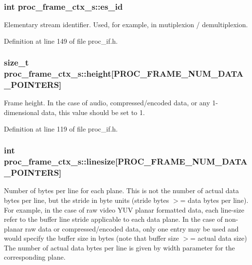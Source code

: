 \subsubsection[{\texorpdfstring{es\+\_\+id}{es_id}}]{\setlength{\rightskip}{0pt plus 5cm}int proc\+\_\+frame\+\_\+ctx\+\_\+s\+::es\+\_\+id}\hypertarget{structproc__frame__ctx__s_a457dcb8ae6440506054f07483f48be1f}{}\label{structproc__frame__ctx__s_a457dcb8ae6440506054f07483f48be1f}
Elementary stream identifier. Used, for example, in mutiplexion / demultiplexion. 

Definition at line 149 of file proc\+\_\+if.\+h.

\subsubsection[{\texorpdfstring{height}{height}}]{\setlength{\rightskip}{0pt plus 5cm}size\+\_\+t proc\+\_\+frame\+\_\+ctx\+\_\+s\+::height\mbox{[}P\+R\+O\+C\+\_\+\+F\+R\+A\+M\+E\+\_\+\+N\+U\+M\+\_\+\+D\+A\+T\+A\+\_\+\+P\+O\+I\+N\+T\+E\+RS\mbox{]}}\hypertarget{structproc__frame__ctx__s_ab3f274e1a3c0df994275d29d7fce36da}{}\label{structproc__frame__ctx__s_ab3f274e1a3c0df994275d29d7fce36da}
Frame height. In the case of audio, compressed/encoded data, or any 1-\/dimensional data, this value should be set to 1. 

Definition at line 119 of file proc\+\_\+if.\+h.

\subsubsection[{\texorpdfstring{linesize}{linesize}}]{\setlength{\rightskip}{0pt plus 5cm}int proc\+\_\+frame\+\_\+ctx\+\_\+s\+::linesize\mbox{[}P\+R\+O\+C\+\_\+\+F\+R\+A\+M\+E\+\_\+\+N\+U\+M\+\_\+\+D\+A\+T\+A\+\_\+\+P\+O\+I\+N\+T\+E\+RS\mbox{]}}\hypertarget{structproc__frame__ctx__s_a68abb3bc396beba4b30cd13b2bcc8eda}{}\label{structproc__frame__ctx__s_a68abb3bc396beba4b30cd13b2bcc8eda}
Number of bytes per line for each plane. This is not the number of actual data bytes per line, but the stride in byte units (stride bytes $>$= data bytes per line). For example, in the case of raw video Y\+UV planar formatted data, each line-\/size refer to the buffer line stride applicable to each data plane. In the case of non-\/planar raw data or compressed/encoded data, only one entry may be used and would specify the buffer size in bytes (note that buffer size $>$= actual data size) The number of actual data bytes per line is given by \textquotesingle{}width\textquotesingle{} parameter for the corresponding plane. 

